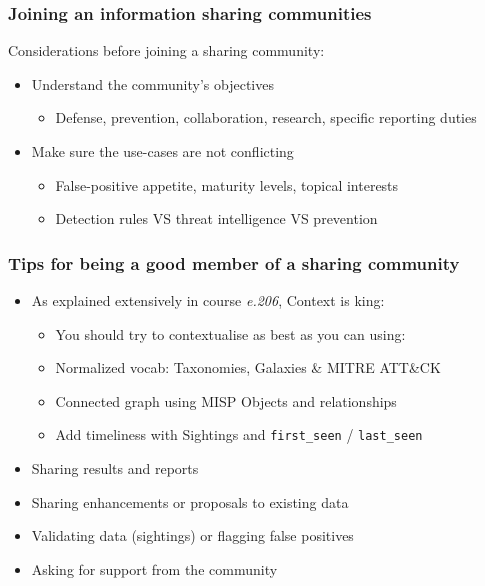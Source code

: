 \begin{frame}
    \frametitle{Joining an information sharing communities}
    Considerations before joining a sharing community:
    \begin{itemize}
        \item Understand the community's objectives
        \begin{itemize}
            \item Defense, prevention, collaboration, research, specific reporting duties
        \end{itemize}
        \item Make sure the use-cases are not conflicting
        \begin{itemize}
            \item False-positive appetite, maturity levels, topical interests
            \item Detection rules VS threat intelligence VS prevention
        \end{itemize}
    \end{itemize}
\end{frame}

\begin{frame}
    \frametitle{Tips for being a good member of a sharing community}
    \begin{itemize}
        \item As explained extensively in course \textit{e.206}, Context is king:
        \begin{itemize}
            \item You should try to contextualise as best as you can using:
            \item Normalized vocab: Taxonomies, Galaxies \& MITRE ATT\&CK
            \item Connected graph using MISP Objects and relationships
            \item Add timeliness with Sightings and \texttt{first\_seen} / \texttt{last\_seen}
        \end{itemize}
        \item Sharing results and reports
        \item Sharing enhancements or proposals to existing data
        \item Validating data (sightings) or flagging false positives
        \item Asking for support from the community
    \end{itemize}
\end{frame}

